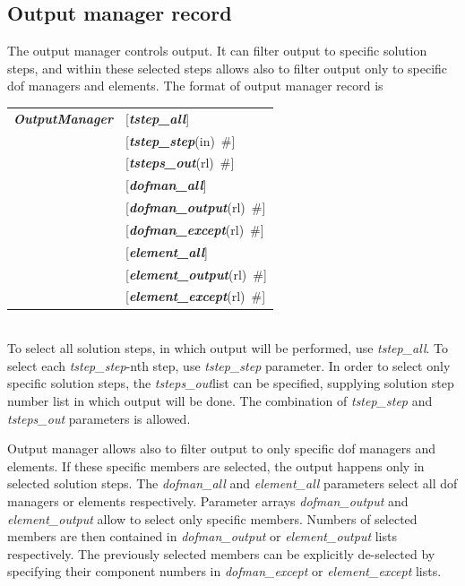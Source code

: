 \documentclass[a4paper]{article}
\makeatletter
\newcommand{\param}[1]{{\em #1}}
\newcommand{\keywordnotype}[1]{\mbox{{\it{\bf{#1}}}}}
\newcommand{\keyword}[2]{\mbox{{\keywordnotype{#1}\tiny (#2)}}}
\newcommand{\field}[2]{\mbox{\keyword{#1}{#2}~\#}}
\newcommand{\optField}[2]{\mbox{[\field{#1}{#2}]}}
\newenvironment{record}[1][]{\begin{tabular}{|ll}}{\end{tabular}\\}
\newcommand{\recentry}[2]{{#1}&{#2}\\}
\newcounter{rcc}
\newenvironment{record}[1][\textwidth]{\setcounter{rcc}{0}\begin{tabular*}{#1}{|ll@{\extracolsep{\fill}}r}}{\end{tabular*}\\}
\newcommand{\recentry}[2]{\ifthenelse{\value{rcc}>0}{&$\backslash$ \\}{\setcounter{rcc}{1}}{#1}&{#2}}
\makeatother
\begin{document}
\subsection{Output manager record}
\label{_OutputManagerRecord}
The output manager controls output. It can filter output to specific
solution steps, and within these selected steps allows also to filter
output only to specific dof managers and elements. The format of
output manager record is \\
\begin{record}
  \recentry{\keywordnotype{OutputManager}}{[\keywordnotype{tstep\_all}]}
  \recentry{}{\optField{tstep\_step}{in}} \recentry{}{\optField{tsteps\_out}{rl}}
  \recentry{}{[\keywordnotype{dofman\_all}]} \recentry{}{\optField{dofman\_output}{rl}}
  \recentry{}{\optField{dofman\_except}{rl}}
  \recentry{}{[\keywordnotype{element\_all}]} \recentry{}{\optField{element\_output}{rl}}
  \recentry{}{\optField{element\_except}{rl}}
\end{record}
To select all solution steps, in which output will be performed, use
\param{tstep\_all}. To select each \param{tstep\_step}-nth step, use
\param{tstep\_step} parameter. In order to select only specific
solution steps, the \param{tsteps\_out}list can be specified,
supplying solution step number list in which output will be done.
The combination of \param{tstep\_step} and
\param{tsteps\_out} parameters is allowed.

Output manager allows also to filter output to only specific dof
managers and elements. If these specific members are selected, the
output happens only in selected solution steps.
The \param{dofman\_all} and \param{element\_all} parameters select
all dof managers or elements respectively. Parameter arrays
\param{dofman\_output} and \param{element\_output} allow to select
only specific members. Numbers of selected members are then contained
in \param{dofman\_output} or \param{element\_output} lists
respectively. The previously selected members can be explicitly
de-selected by specifying their component numbers in \param{dofman\_except} or
\param{element\_except} lists.
\end{document}
